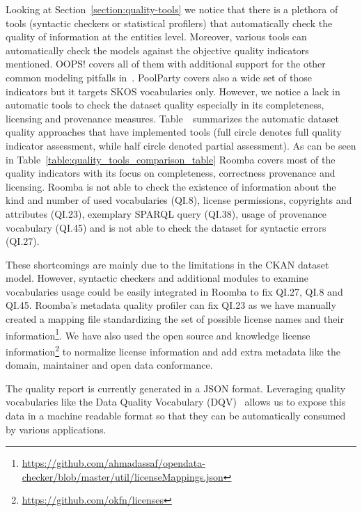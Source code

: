 Looking at Section~\ref{section:quality-tools} we notice that there is a plethora of tools (syntactic checkers or statistical profilers) that automatically check the quality of information at the entities level. Moreover, various tools can automatically check the models against the objective quality indicators mentioned. OOPS! covers all of them with additional support for the other common modeling pitfalls in~\cite{Maria:KEOD:13}. PoolParty covers also a wide set of those indicators but it targets SKOS vocabularies only. However, we notice a lack in automatic tools to check the dataset quality especially in its completeness, licensing and provenance measures. Table~\ summarizes the automatic dataset quality approaches that have implemented tools (full circle denotes full quality indicator assessment, while half circle denoted partial assessment). As can be seen in Table~\ref{table:quality_tools_comparison_table} Roomba covers most of the quality indicators with its focus on completeness, correctness provenance and licensing. Roomba is not able to check the existence of information about the kind and number of used vocabularies (QI.8), license permissions, copyrights and attributes (QI.23), exemplary SPARQL query (QI.38), usage of provenance vocabulary (QI.45) and is not able to check the dataset for syntactic errors (QI.27).

These shortcomings are mainly due to the limitations in the CKAN dataset model. However, syntactic checkers and additional modules to examine vocabularies usage could be easily integrated in Roomba to fix QI.27, QI.8 and QI.45. Roomba's metadata quality profiler can fix QI.23 as we have manually created a mapping file standardizing the set of possible license names and their information\footnote{\url{https://github.com/ahmadassaf/opendata-checker/blob/master/util/licenseMappings.json}}. We have also used the open source and knowledge license information\footnote{\url{https://github.com/okfn/licenses}} to normalize license information and add extra metadata like the domain, maintainer and open data conformance.

The quality report is currently generated in a JSON format. Leveraging quality vocabularies like the Data Quality Vocabulary (DQV)~\cite{Debattista:DQV:15} allows us to expose this data in a machine readable format so that they can be automatically consumed by various applications.

